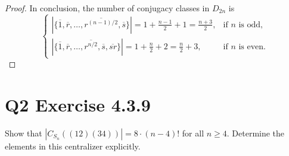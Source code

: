 \documentclass[12pt]{article}
\newenvironment{problem}
    {\begin{lrbox}{\mybox}\begin{minipage}{0.98\textwidth}}
    {\end{minipage}\end{lrbox}\framebox[\textwidth]{\usebox{\mybox}}}
\newcommand{\<}{\left\langle} %
\renewcommand{\>}{\right\rangle} %
\let\eqc\overline %
\begin{document}
\begin{proof}
    In conclusion, the number of conjugacy classes in $D_{2n}$ is
    \[\begin{cases}
        |\{\eqc{1}, \eqc{r}, \dots, \eqc{r^{(n-1)/2}}, \eqc{s}\}| = 1 + \frac{n-1}2 + 1 = \frac{n+3}2, &\text{if $n$ is odd,} \\
        |\{\eqc{1}, \eqc{r}, \dots, \eqc{r^{n/2}}, \eqc{s}, \eqc{sr}\}| = 1 + \frac n2 + 2 = \frac{n}2 + 3, &\text{if $n$ is even.}
    \end{cases}\]
    
    
\end{proof}

\newpage
\section*{Q2 Exercise 4.3.9}
\begin{problem}
    Show that $|C_{S_n}((12)(34))| = 8\cdot(n-4)!$ for all $n\geq 4$. Determine the elements in this centralizer explicitly. 
\end{problem}
\end{document}
